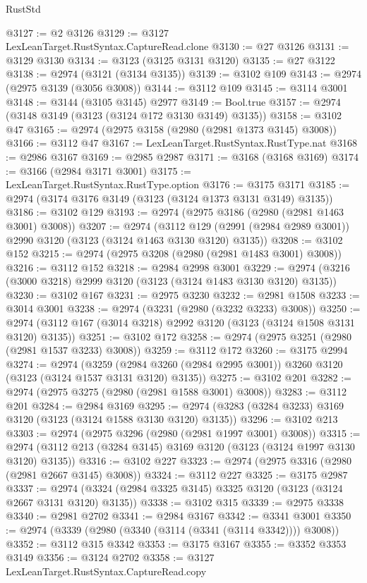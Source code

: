 \begin{lexlean}{RustStd}
\begin{coremodule}
@3127 := @2 @3126
@3129 := @3127 LexLeanTarget.RustSyntax.CaptureRead.clone
@3130 := @27 @3126
@3131 := @3129 @3130
@3134 := @3123 (@3125 @3131 @3120)
@3135 := @27 @3122
@3138 := @2974 (@3121 (@3134 @3135))
@3139 := @3102 @109
@3143 := @2974 (@2975 @3139 (@3056 @3008))
@3144 := @3112 @109
@3145 := @3114 @3001
@3148 := @3144 (@3105 @3145) @2977
@3149 := Bool.true
@3157 := @2974 (@3148 @3149 (@3123 (@3124 @172 @3130 @3149) @3135))
@3158 := @3102 @47
@3165 := @2974 (@2975 @3158 (@2980 (@2981 @1373 @3145) @3008))
@3166 := @3112 @47
@3167 := LexLeanTarget.RustSyntax.RustType.nat
@3168 := @2986 @3167
@3169 := @2985 @2987
@3171 := @3168 (@3168 @3169)
@3174 := @3166 (@2984 @3171 @3001)
@3175 := LexLeanTarget.RustSyntax.RustType.option
@3176 := @3175 @3171
@3185 := @2974 (@3174 @3176 @3149 (@3123 (@3124 @1373 @3131 @3149) @3135))
@3186 := @3102 @129
@3193 := @2974 (@2975 @3186 (@2980 (@2981 @1463 @3001) @3008))
@3207 := @2974
    (@3112 @129 (@2991 (@2984 @2989 @3001)) @2990 @3120 (@3123 (@3124 @1463 @3130 @3120) @3135))
@3208 := @3102 @152
@3215 := @2974 (@2975 @3208 (@2980 (@2981 @1483 @3001) @3008))
@3216 := @3112 @152
@3218 := @2984 @2998 @3001
@3229 := @2974 (@3216 (@3000 @3218) @2999 @3120 (@3123 (@3124 @1483 @3130 @3120) @3135))
@3230 := @3102 @167
@3231 := @2975 @3230
@3232 := @2981 @1508
@3233 := @3014 @3001
@3238 := @2974 (@3231 (@2980 (@3232 @3233) @3008))
@3250 := @2974 (@3112 @167 (@3014 @3218) @2992 @3120 (@3123 (@3124 @1508 @3131 @3120) @3135))
@3251 := @3102 @172
@3258 := @2974 (@2975 @3251 (@2980 (@2981 @1537 @3233) @3008))
@3259 := @3112 @172
@3260 := @3175 @2994
@3274 := @2974
    (@3259 (@2984 @3260 (@2984 @2995 @3001)) @3260 @3120 (@3123 (@3124 @1537 @3131 @3120) @3135))
@3275 := @3102 @201
@3282 := @2974 (@2975 @3275 (@2980 (@2981 @1588 @3001) @3008))
@3283 := @3112 @201
@3284 := @2984 @3169
@3295 := @2974 (@3283 (@3284 @3233) @3169 @3120 (@3123 (@3124 @1588 @3130 @3120) @3135))
@3296 := @3102 @213
@3303 := @2974 (@2975 @3296 (@2980 (@2981 @1997 @3001) @3008))
@3315 := @2974 (@3112 @213 (@3284 @3145) @3169 @3120 (@3123 (@3124 @1997 @3130 @3120) @3135))
@3316 := @3102 @227
@3323 := @2974 (@2975 @3316 (@2980 (@2981 @2667 @3145) @3008))
@3324 := @3112 @227
@3325 := @3175 @2987
@3337 := @2974 (@3324 (@2984 @3325 @3145) @3325 @3120 (@3123 (@3124 @2667 @3131 @3120) @3135))
@3338 := @3102 @315
@3339 := @2975 @3338
@3340 := @2981 @2702
@3341 := @2984 @3167
@3342 := @3341 @3001
@3350 := @2974 (@3339 (@2980 (@3340 (@3114 (@3341 (@3114 @3342)))) @3008))
@3352 := @3112 @315 @3342
@3353 := @3175 @3167
@3355 := @3352 @3353 @3149
@3356 := @3124 @2702
@3358 := @3127 LexLeanTarget.RustSyntax.CaptureRead.copy

\end{coremodule}
\end{lexlean}
